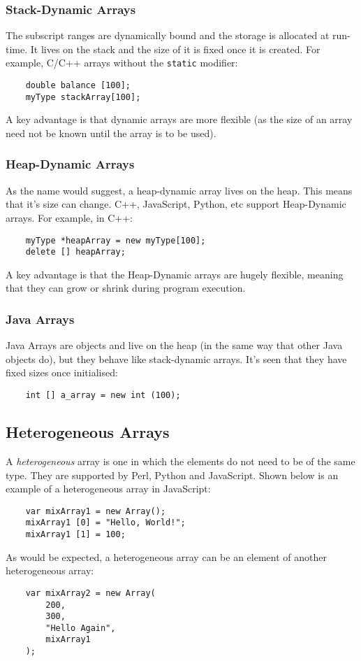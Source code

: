 \subsubsection{Stack-Dynamic Arrays}
The subscript ranges are dynamically bound and the storage is allocated at run-time. It lives on the stack and the size of it is fixed once it is created. For example, C/C++ arrays without the \verb|static| modifier:
\begin{verbatim}
    double balance [100]; 
    myType stackArray[100];
\end{verbatim}
A key advantage is that dynamic arrays are more flexible (as the size of an array need not be known until the array is to be used). 

\subsubsection{Heap-Dynamic Arrays}
As the name would suggest, a heap-dynamic array lives on the heap. This means that it's size can change. C++, JavaScript, Python, etc support Heap-Dynamic arrays. For example, in C++:
\begin{verbatim}
    myType *heapArray = new myType[100];
    delete [] heapArray;
\end{verbatim}
A key advantage is that the Heap-Dynamic arrays are hugely flexible, meaning that they can grow or shrink during program execution.

\subsubsection{Java Arrays}
Java Arrays are objects and live on the heap (in the same way that other Java objects do), but they behave like stack-dynamic arrays. It's seen that they have fixed sizes once initialised:
\begin{verbatim}
    int [] a_array = new int (100);
\end{verbatim}

\subsection{Heterogeneous Arrays}
A \textit{heterogeneous} array is one in which the elements do not need to be of the same type. They are supported by Perl, Python and JavaScript. Shown below is an example of a heterogeneous array in JavaScript:
\begin{verbatim}
    var mixArray1 = new Array();
    mixArray1 [0] = "Hello, World!";
    mixArray1 [1] = 100;
\end{verbatim}
As would be expected, a heterogeneous array can be an element of another heterogeneous array:
\begin{verbatim}
    var mixArray2 = new Array(
        200,
        300,
        "Hello Again",
        mixArray1
    );
\end{verbatim}

